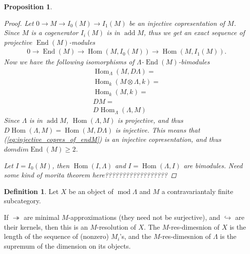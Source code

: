 \documentclass[11pt, a4paper, english]{article}
\newtheorem{prop}[theorem]{Proposition}
\theoremstyle{definition}
\newtheorem{defn}[theorem]{Definition}
\DeclareMathOperator{\Hom}{Hom}
\DeclareMathOperator{\End}{End}
\DeclareMathOperator{\add}{add}
\def\mod{\operatorname{mod}}
\begin{document}
\begin{prop}
\begin{proof}
		Let $0 \to M \to I_0(M) \to I_1(M)$ be an injective copresentation of $M$. Since $M$ is a cogenerator $I_i(M)$ is in $\add M$, thus we get an exact sequence of projective $\End(M)$-modules
		\begin{align} \label{eq:injective_copres_of_endM}
			0 \to \End(M) \to \Hom(M, I_0(M)) \to \Hom(M, I_1(M)).
		\end{align}
		Now we have the following isomorphisms of $\Lambda$-$\End(M)$-bimodules
		\begin{align*}
			\Hom_\Lambda(M, D\Lambda) =\\
			\Hom_k(M\otimes\Lambda, k) =\\
			\Hom_k(M, k) =\\
			DM =\\
			D\Hom_\Lambda(\Lambda, M)
		\end{align*}
		Since $\Lambda$ is in $\add M$, $\Hom(\Lambda, M)$ is projective, and thus $D\Hom(\Lambda, M) = \Hom(M, D\Lambda)$ is injective. This means that (\ref{eq:injective_copres_of_endM}) is an injective copresentation, and thus $domdim\End(M) \geq 2$.
		
		Let $I=I_0(M)$, then $\Hom(I, \Lambda)$ and $I = \Hom(\Lambda, I)$ are bimodules. Need some kind of morita theorem here?????????????????? 
	\end{proof}
\end{prop}

\begin{defn}
	Let $X$ be an object of $\mod\Lambda$ and $M$ a contravariantaly finite subcategory.
	\begin{center}
	\end{center}
	If $\twoheadrightarrow$ are minimal $M$-approximations (they need not be surjective), and $\hookrightarrow$ are their kernels, then this is an $M$-resolution of $X$. The $M$-res-dimesnion of $X$ is the length of the sequence of (nonzero) $M_i$'s, and the $M$-res-dimesnion of $\Lambda$ is the supremum of the dimension on its objects.

\end{defn}
\end{document}
